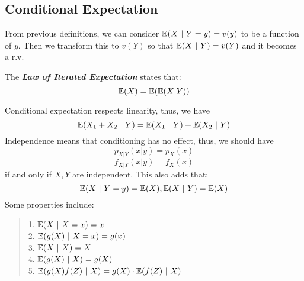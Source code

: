 \subsection{Conditional Expectation}
From previous definitions, we can consider $\mathbb{E}(X \ | \ Y = y) = v(y)$ to be a function of $y$. Then we transform this to $v(Y)$ so that $\mathbb{E}(X \ | \ Y) = v(Y)$ and it becomes a r.v.
\begin{theorem}
    The \textbf{\textit{Law of Iterated Expectation}} states that:
    $$\mathbb{E}(X) = \mathbb{E}(\mathbb{E}(X | Y))$$
\end{theorem}
Conditional expectation respects linearity, thus, we have
$$\mathbb{E}(X_1 + X_2 \ | \ Y) = \mathbb{E}(X_1 \ | \ Y) + \mathbb{E}(X_2 \ | \ Y)$$
Independence means that conditioning has no effect, thus, we should have
$$p_{X|Y}(x|y) = p_X(x)$$
$$f_{X|Y}(x|y) = f_X(x)$$
if and only if $X, Y$ are independent. This also adds that:
$$\mathbb{E}(X \ | \ Y = y) = \mathbb{E}(X), \mathbb{E}(X \ | \ Y) = \mathbb{E}(X)$$
Some properties include:
\begin{quote}
    1. $\mathbb{E}(X \ | \ X = x) = x$ \\
    2. $\mathbb{E}(g(X) \ | \ X = x) = g(x)$ \\
    3. $\mathbb{E}(X \ | \ X) = X$ \\
    4. $\mathbb{E}(g(X) \ | \ X) = g(X)$ \\
    5. $\E(g(X)f(Z) \ | \ X) = g(X) \cdot \E(f(Z)\ | \ X)$
\end{quote}

\newpage